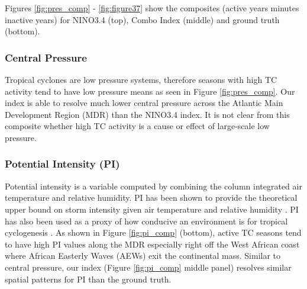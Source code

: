\documentclass[]{article}
\begin{document}
Figures \ref{fig:pres_comp} - \ref{fig:figure37} show the composites (active years minutes inactive years) for NINO3.4 (top), Combo Index (middle) and ground truth (bottom).
\subsubsection{Central Pressure}
Tropical cyclones are low pressure systems, therefore seasons with high TC activity tend to have low pressure means as seen in Figure \ref{fig:pres_comp}. Our index is able to resolve much lower central pressure across the Atlantic Main Development Region (MDR) than the NINO3.4 index. It is not clear from this composite whether high TC activity is a cause or effect of large-scale low pressure.


\subsubsection{Potential Intensity (PI)}
Potential intensity is a variable computed by combining the column integrated air temperature and relative humidity. PI has been shown to provide the theoretical upper bound on storm intensity given air temperature and relative humidity \cite{emanuel1999}. PI has also been used as a proxy of how conducive an environment is for tropical cyclogenesis \cite{emanuel2008}. As shown in Figure \ref{fig:pi_comp} (bottom), active TC seasons tend to have high PI values along the MDR especially right off the West African coast where African Easterly Waves (AEWs) exit the continental mass. Similar to central pressure, our index (Figure \ref{fig:pi_comp} middle panel) resolves similar spatial patterns for PI than the ground truth.
\end{document}
